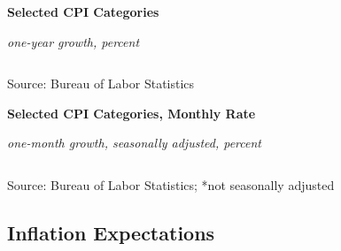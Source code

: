 \documentclass{report}
\begin{document}
{\begin{minipage}{1.0\textwidth} 
\small 
\vspace{1.5mm}

\normalsize \textbf{Selected CPI Categories}\\
\footnotesize{\textit{one-year growth, percent}\\
\hspace*{-3mm}  \setlength{\tabcolsep}{2.6pt} \color{black!90}
		{\renewcommand{\arraystretch}{1.5}
\begin{tabular}{p{42mm} R{8.0mm} R{8.0mm} R{8.0mm} R{8.0mm}
		 		 R{8.0mm} R{10.0mm} R{12.0mm}} %
			  \hline
		\end{tabular}}}
\vspace{-2mm}		
		
\footnotesize{Source: Bureau of Labor Statistics}
\end{minipage}
\newpage
\vspace*{-11mm}

\begin{minipage}{1.0\textwidth} 
\small 
\end{minipage}
\vspace{0.5mm}

\normalsize \textbf{Selected CPI Categories, Monthly Rate}\\
\footnotesize{\textit{one-month growth, seasonally adjusted, percent}\\
\hspace*{-3mm}  \setlength{\tabcolsep}{2.5pt} \color{black!90}
		{\renewcommand{\arraystretch}{1.38}
\begin{tabular}{p{39mm} R{8.2mm} R{8.2mm} R{8.2mm} R{8.2mm} R{8.2mm} R{8.2mm} 
		R{8.2mm} R{8.2mm}} %
			  \hline
		\end{tabular}}}
\vspace{-2mm}		
		
\footnotesize{Source: Bureau of Labor Statistics; *not seasonally adjusted
\newpage
\hypertarget{prie}{\label{prie}}
\vspace*{-9mm}

\begin{minipage}{1.0\textwidth}
\subsection*{Inflation Expectations}
\vspace{-1mm}


\end{minipage}}}
\end{document}
